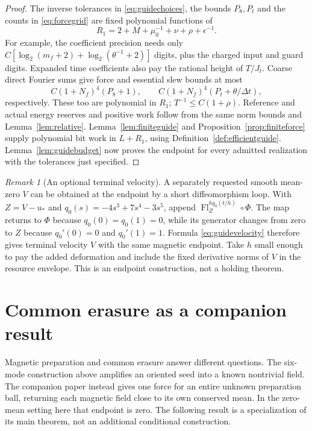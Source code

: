 \documentclass[11pt,a4paper]{amsart}
\theoremstyle{definition}
\theoremstyle{remark}
\newtheorem{remark}[theorem]{Remark}
\numberwithin{equation}{section}
\newcommand{\Flow}{\operatorname{Fl}}
\begin{document}
\begin{proof}
The inverse tolerances in \eqref{eq:guidechoices}, the bounds $P_8,P_t$ and the counts in \eqref{eq:forcegrid} are fixed polynomial functions of
\[
 R_1=2+M+\mu_0^{-1}+\nu+\rho+\epsilon^{-1}.
\]
For example, the coefficient precision needs only
$C[\log_2(m_f+2)+\log_2(\theta^{-1}+2)]$ digits, plus the charged input and guard digits. Expanded time coefficients also pay the rational height of $T/J_t$. Coarse direct Fourier sums give force and essential slew bounds at most
\[
 C(1+N_f)^4(P_8+1),\qquad
 C(1+N_f)^4(P_t+\theta/\Delta t),
\]
respectively. These too are polynomial in $R_1$; $T^{-1}\le C(1+\rho)$. Reference and actual energy reserves and positive work follow from the same norm bounds and Lemma~\ref{lem:relative}. Lemma~\ref{lem:finiteguide} and Proposition~\ref{prop:finiteforce} supply polynomial bit work in $L+R_1$, using Definition~\ref{def:efficientguide}. Lemma~\ref{lem:guidebudget} now proves the endpoint for every admitted realization with the tolerances just specified.
\end{proof}

\begin{remark}[An optional terminal velocity]
A separately requested smooth mean-zero $V$ can be obtained at the endpoint by a short diffeomorphism loop. With $Z=V-u_*$ and $q_0(s)=-4s^3+7s^4-3s^5$, append
$\Flow_Z^{h q_0(t/h)}\circ\Phi$. The map returns to $\Phi$ because $q_0(0)=q_0(1)=0$, while its generator changes from zero to $Z$ because $q_0'(0)=0$ and $q_0'(1)=1$. Formula \eqref{eq:guidevelocity} therefore gives terminal velocity $V$ with the same magnetic endpoint. Take $h$ small enough to pay the added deformation and include the fixed derivative norms of $V$ in the resource envelope. This is an endpoint construction, not a holding theorem.
\end{remark}



\section{Common erasure as a companion result}\label{sec:ensemble}
Magnetic preparation and common erasure answer different questions. The six-mode construction above amplifies an oriented seed into a known nontrivial field. The companion paper \cite{CommonControl} instead gives one force for an entire unknown preparation ball, returning each magnetic field close to its own conserved mean. In the zero-mean setting here that endpoint is zero. The following result is a specialization of its main theorem, not an additional conditional construction.
\end{document}
